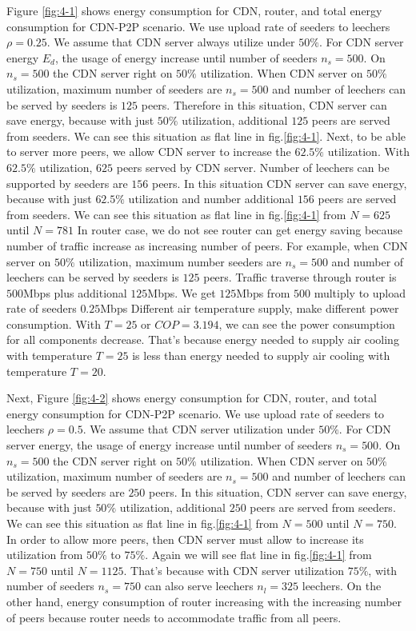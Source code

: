 \documentclass[conference]{IEEEtran}
\begin{document}
Figure \ref{fig:4-1} shows energy consumption for CDN, router, and total energy consumption for CDN-P2P scenario.
We use upload rate of seeders to leechers $\rho=0.25$.
We assume that CDN server always utilize under $50\%$.
For CDN server energy $E_d$, the usage of energy increase until number of seeders $n_s=500$.
On $n_s=500$ the CDN server right on $50\%$ utilization.
When CDN server on $50\%$ utilization, maximum number of seeders are $n_s=500$ and number of leechers can be served by seeders is $125$ peers.  
Therefore in this situation, CDN server can save energy, because with just $50\%$ utilization, additional $125$ peers are served from seeders.  
We can see this situation as flat line in fig.\ref{fig:4-1}.
Next, to be able to server more peers, we allow CDN server to increase the $62.5\%$ utilization.
With $62.5\%$ utilization, $625$ peers served by CDN server. 
Number of leechers can be supported by seeders are $156$ peers.
In this situation CDN server can save energy, because with just $62.5\%$ utilization and number additional $156$ peers are served from seeders.  
We can see this situation as flat line in fig.\ref{fig:4-1} from $N=625$ until $N=781$
In router case, we do not see router can get energy saving because number of traffic increase as increasing number of peers. 
For example, when CDN server on $50\%$ utilization, maximum number seeders are $n_s=500$ and number of leechers can be served by seeders is $125$ peers.
Traffic traverse through router is $500$Mbps plus additional $125$Mbps. 
We get $125$Mbps from $500$ multiply to upload rate of seeders $0.25$Mbps
Different air temperature supply, make different power consumption.  
With $T=25$ or $COP=3.194$, we can see the power consumption for all components decrease.
That's because energy needed to supply air cooling with temperature $T=25$ is less than  energy needed to supply air cooling with temperature $T=20$.

Next, Figure \ref{fig:4-2} shows energy consumption for CDN, router, and total energy consumption for CDN-P2P scenario.
We use upload rate of seeders to leechers $\rho=0.5$.
We assume that CDN server utilization under $50\%$.
For CDN server energy, the usage of energy increase until number of seeders $n_s=500$.
On $n_s=500$ the CDN server right on $50\%$ utilization.
When CDN server on $50\%$ utilization, maximum number of seeders are $n_s=500$ and number of leechers can be served by seeders are $250$ peers.
In this situation, CDN server can save energy, because with just $50\%$ utilization, additional $250$ peers are served from seeders. 
We can see this situation as flat line in fig.\ref{fig:4-1} from $N=500$ until $N=750$.
In order to allow more peers, then CDN server must allow to increase its utilization from $50\%$ to $75\%$.
Again we will see flat line in fig.\ref{fig:4-1} from $N=750$ until $N=1125$. 
That's because with CDN server utilization $75\%$, with number of seeders $n_s=750$ can also serve leechers $n_l=325$ leechers.
On the other hand, energy consumption of router increasing with the increasing number of peers because router needs to accommodate traffic from all peers. 
\end{document}
